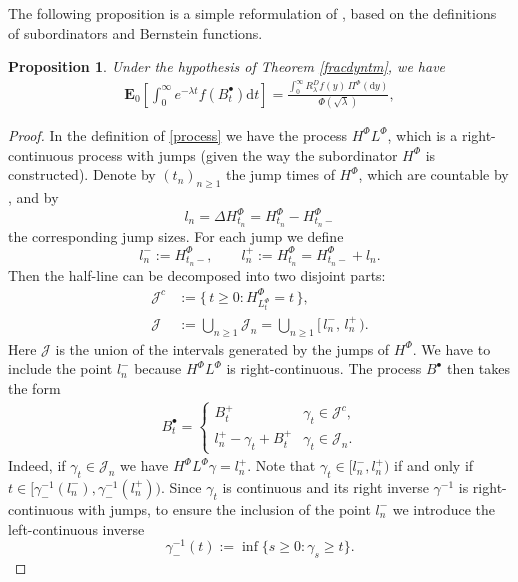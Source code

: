 \documentclass[11pt,a4paper]{article}
\theoremstyle{plain}
\newtheorem{proposition}[theorem]{Proposition}
\theoremstyle{definition}
\theoremstyle{remark}
\begin{document}
		The following proposition is a simple reformulation of \cite[Formula 6, Section 15]{ito1963brownian}, based on the definitions of subordinators and Bernstein functions.
		\begin{proposition}
			Under the hypothesis of Theorem \ref{fracdyntm}, we have
			\begin{align*} \mathbf{E}_0 \left[ \int _{0}^\infty e^{-\lambda t}f(B_t^\bullet ) \textrm{d}t\right] = \frac{\int _0^\infty R_\lambda ^D f(y) \, \Pi ^\Phi (\textrm{d}y)}{\Phi (\sqrt{\lambda })}, \end{align*}
		\end{proposition}
		
		\begin{proof}
			In the definition of \eqref{process} we have the process $H^\Phi L^\Phi$, which is a right-continuous process with jumps (given the way the subordinator $H^\Phi$ is constructed). Denote by $(t_n)_{n\geq 1}$ the jump times of $H^\Phi$, which are countable by \cite[Theorem 21.3]{sato1999levy}, and by
			\[
			l_n = \Delta H^\Phi_{t_n}=H^\Phi_{t_n}-H^\Phi_{t_n-}
			\]
			the corresponding jump sizes.
			For each jump we define
			\[
			l_n^- := H^\Phi_{t_n-},
			\qquad
			l_n^+ := H^\Phi_{t_n} = H^\Phi_{t_n-} + l_n.
			\]
			Then the half-line can be decomposed into two disjoint parts:
			\begin{align*}
				\mathcal{J}^c &:= \{\, t \geq 0 : H^\Phi_{L^\Phi_t} = t \,\}, \\
				\mathcal{J} &:= \bigcup_{n \geq 1} \mathcal{J}_n
				= \bigcup_{n \geq 1} [\, l_n^-,\, l_n^+ \,).
			\end{align*}
			Here $\mathcal{J}$ is the union of the intervals generated by the jumps of $H^\Phi$. We have to include the point $l_n^-$ because $H^\Phi L^\Phi$ is right-continuous. The process $B^\bullet$ then takes the form
			\begin{align*}
				B^\bullet_t =
				\begin{cases}
					B^+_t &\gamma_t \in \mathcal{J}^c,\\[4pt]
					l_n^+ - \gamma_t + B^+_t &\gamma_t \in \mathcal{J}_n.
				\end{cases}
			\end{align*}
			Indeed, if $\gamma_t \in \mathcal{J}_n$ we have $H^\Phi L^\Phi \gamma = l_n^+$. Note that $\gamma_t \in [l_n^-,l_n^+)$ if and only if $t \in [\gamma_{-}^{-1}(l_n^-), \gamma_{-}^{-1}(l_n^+))$. Since $\gamma_t$ is continuous and its right inverse $\gamma^{-1}$ is right-continuous with jumps, to ensure the inclusion of the point $l_n^-$ we introduce the left-continuous inverse
			\[
			\gamma_{-}^{-1}(t):=\inf \{s \geq 0 : \gamma_s \geq t\}.
			\]
			

\end{proof}
\end{document}
